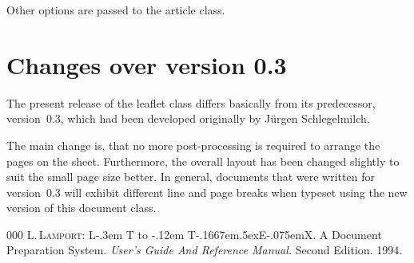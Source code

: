 \documentclass[
]{leaflet}
\makeatletter
\def\ptmTeX{T\kern-.1667em\lower.5ex\hbox{E}\kern-.075emX\@}
\DeclareRobustCommand{\ptmLaTeX}{L\kern-.3em
        {\setbox0\hbox{T}%
         \vbox to\ht0{\hbox{%
                            \csname S@\f@size\endcsname
                            \fontsize\sf@size\z@
                            \math@fontsfalse\selectfont
                            A}%
                      \vss}%
        }%
        \kern-.12em
        \ptmTeX}
\let\LaTeX=\ptmLaTeX
\newcommand\Lclass[1]{\textsf{#1}}
\makeatother
\begin{document}
Other options are passed to the \Lclass{article} class.

\section{Changes over version 0.3}

The present release of the \Lclass{leaflet} class differs basically
from its predecessor, version~0.3, which had been developed originally
by J\"urgen Schlegelmilch.

The main change is, that no more post-processing is required to
arrange the pages on the sheet.
Furthermore, the overall layout has been changed slightly to suit the
small page size better.
In general, documents that were written for version~0.3 will exhibit
different line and page breaks when typeset using the new version of
this document class.

\begin{thebibliography}{000}
  \textsc{L.\,Lamport}: \LaTeX. A Document Preparation System.
  \textit{User's Guide And Reference Manual.} Second Edition. 1994.
\end{thebibliography}

\loggingall
\end{document}
